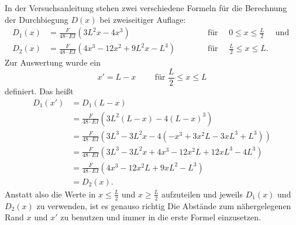 In der Versuchsanleitung stehen zwei verschiedene Formeln für die Berechnung der Durchbiegung $D(x)$ bei zweiseitiger Auflage:
\begin{align*}
	D_1(x) &= \frac{F}{48\cdot EI}\left(3L^2x-4x^3\right) \qquad && \text{ für }\quad 0\leq x\leq\frac{L}{2}\quad\text{ und } \\
	D_2(x) &= \frac{F}{48\cdot EI}\left(4x^3-12x^2+9L^2x-L^3\right) \qquad && \text{ für }\quad \frac{L}{2}\leq x\leq L.
\end{align*}
Zur Auswertung wurde ein
\begin{equation*}
	x' = L-x \qquad \text{ für } \frac{L}{2}\leq x\leq L
\end{equation*}
definiert. Das heißt
\begin{align*}
	D_1(x') &= D_1(L-x) \\
	&= \frac{F}{48\cdot EI}\left(3L^2(L-x)-4(L-x)^3\right) \\
	&= \frac{F}{48\cdot EI}\left(3L^3-3L^2x-4(-x^3+3x^2L-3xL^3+L^3) \right) \\
	&= \frac{F}{48\cdot EI}\left(3L^3-3L^2x+4x^3-12x^2L+12xL^3-4L^3\right) \\
	&= \frac{F}{48\cdot EI}\left(4x^3-12x^2L+9xL^2-L^3\right) \\
	&= D_2(x).
\end{align*}
Anstatt also die Werte in $x\leq\frac{L}{2}$ und $x\geq\frac{L}{2}$ aufzuteilen und jeweils $D_1(x)$ und $D_2(x)$ zu verwenden, ist es genauso richtig Die Abstände zum nähergelegenen Rand $x$ und $x'$ zu benutzen und immer in die erste Formel einzusetzen.

